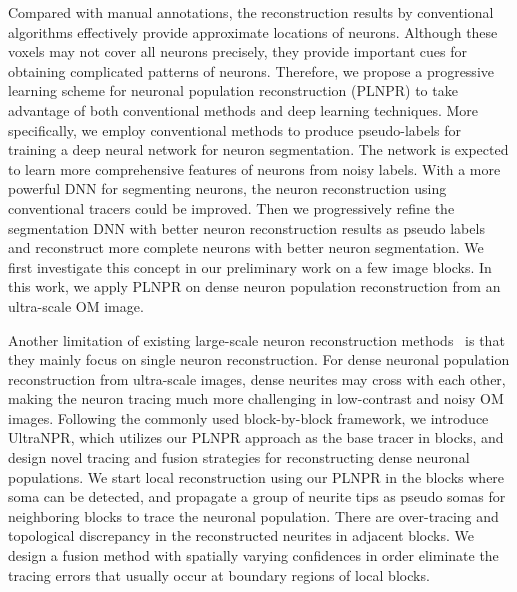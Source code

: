 Compared with manual annotations, the reconstruction results by conventional algorithms effectively provide approximate locations of neurons. 
Although these voxels may not cover all neurons precisely, they provide important cues for obtaining complicated patterns of neurons.
Therefore, we propose a progressive learning scheme for neuronal population reconstruction (PLNPR) to take advantage of both conventional methods and deep learning techniques.
More specifically, we employ conventional methods to produce pseudo-labels for training a deep neural network for neuron segmentation. 
The network is expected to learn more comprehensive features of neurons from noisy labels. 
With a more powerful DNN for segmenting neurons, the neuron reconstruction using conventional tracers could be improved. 
Then we progressively refine the segmentation DNN with better neuron reconstruction results as pseudo labels and reconstruct more complete neurons with better neuron segmentation.
We first investigate this concept in our preliminary work \cite{Zhao2019} on a few image blocks. 
In this work, we apply PLNPR on dense neuron population reconstruction from an ultra-scale OM image. 

Another limitation of existing large-scale neuron reconstruction methods~\cite{Zhou2015, Peng2017, Wang2018} is that they mainly focus on single neuron reconstruction. 
%
For dense neuronal population reconstruction from ultra-scale images, dense neurites may cross with each other, making the neuron tracing much more challenging in low-contrast and noisy OM images. 
% 
Following the commonly used block-by-block framework, we introduce UltraNPR, which utilizes our PLNPR approach as the base tracer in blocks, and design novel tracing and fusion strategies for reconstructing dense neuronal populations.
%
We start local reconstruction using our PLNPR in the blocks where soma can be detected, and propagate a group of neurite tips as pseudo somas for neighboring blocks to trace the neuronal population. 
%
There are over-tracing and topological discrepancy in the reconstructed neurites in adjacent blocks. 
We design a fusion method with spatially varying confidences in order eliminate the tracing errors that usually occur at boundary regions of local blocks.   


